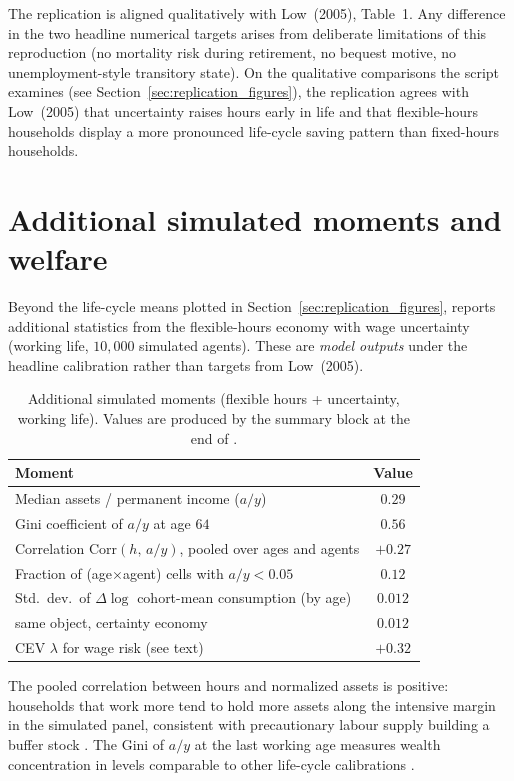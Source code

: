 \documentclass[titlepage, headings=optiontotocandhead]{econark} %
\begin{document}
The replication is aligned qualitatively with Low~(2005), Table~1. Any
difference in the two headline numerical targets arises from deliberate
limitations of this reproduction (no mortality risk during retirement,
no bequest motive, no unemployment-style transitory state). On the
qualitative comparisons the script examines (see
Section~\ref{sec:replication_figures}), the replication agrees with Low~(2005)
that uncertainty raises hours early in life and that flexible-hours
households display a more pronounced life-cycle saving pattern than
fixed-hours households.

\section{Additional simulated moments and welfare}\label{sec:extra-moments}
Beyond the life-cycle means plotted in Section~\ref{sec:replication_figures},
 reports additional statistics from the
flexible-hours economy with wage uncertainty (working life, $10{,}000$
simulated agents).  These are \emph{model outputs} under the headline
calibration rather than targets from Low~(2005).

\begin{table}[htbp]
  \centering
  \caption{Additional simulated moments (flexible hours + uncertainty,
  working life). Values are produced by the summary block at the end of
  .}
  \label{tab:extra-moments}
  \begin{tabular}{lc}
    \toprule
    Moment & Value \\
    \midrule
    Median assets / permanent income ($a/y$) & $0.29$ \\
    Gini coefficient of $a/y$ at age $64$ & $0.56$ \\
    Correlation $\mathrm{Corr}(h,\,a/y)$, pooled over ages and agents & $+0.27$ \\
    Fraction of (age$\times$agent) cells with $a/y < 0.05$ & $0.12$ \\
    Std.\ dev.\ of $\Delta\log$ cohort-mean consumption (by age) & $0.012$ \\
    \quad same object, certainty economy & $0.012$ \\
    CEV $\lambda$ for wage risk (see text) & $+0.32$ \\
    \bottomrule
  \end{tabular}
\end{table}

The pooled correlation between hours and normalized assets is positive:
households that work more tend to hold more assets along the intensive
margin in the simulated panel, consistent with precautionary labour supply
building a buffer stock \citep{Carroll1997Low, Deaton1991Low}.  The
Gini of $a/y$ at the last working age measures wealth concentration in
levels comparable to other life-cycle calibrations \citep{Cagetti2003Low}.
\end{document}
